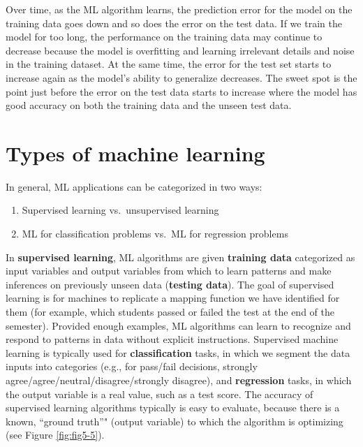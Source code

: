 \documentclass[]{book}
\providecommand{\tightlist}{%
  \setlength{\itemsep}{0pt}\setlength{\parskip}{0pt}}
\begin{document}
Over time, as the ML algorithm learns, the prediction error for the model on the training data goes down and so does the error on the test data. If we train the model for too long, the performance on the training data may continue to decrease because the model is overfitting and learning irrelevant details and noise in the training dataset. At the same time, the error for the test set starts to increase again as the model's ability to generalize decreases. The sweet spot is the point just before the error on the test data starts to increase where the model has good accuracy on both the training data and the unseen test data.

\hypertarget{types-of-machine-learning}{%
\section{Types of machine learning}\label{types-of-machine-learning}}

In general, ML applications can be categorized in two ways:

\begin{enumerate}
\def\labelenumi{\arabic{enumi}.}
\tightlist
\item
  Supervised learning vs.~unsupervised learning
\item
  ML for classification problems vs.~ML for regression problems
\end{enumerate}

In \textbf{supervised learning}, ML algorithms are given \textbf{training data} categorized as input variables and output variables from which to learn patterns and make inferences on previously unseen data (\textbf{testing data}). The goal of supervised learning is for machines to replicate a mapping function we have identified for them (for example, which students passed or failed the test at the end of the semester). Provided enough examples, ML algorithms can learn to recognize and respond to patterns in data without explicit instructions. Supervised machine learning is typically used for \textbf{classification} tasks, in which we segment the data inputs into categories (e.g., for pass/fail decisions, strongly agree/agree/neutral/disagree/strongly disagree), and \textbf{regression} tasks, in which the output variable is a real value, such as a test score. The accuracy of supervised learning algorithms typically is easy to evaluate, because there is a known, ``ground truth''" (output variable) to which the algorithm is optimizing (see Figure \ref{fig:fig5-5}).
\end{document}
